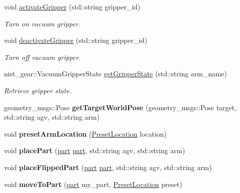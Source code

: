\begin{DoxyCompactItemize}
void \hyperlink{classGantryControl_aaccd9c43b5564c198288ba51cbcecabe}{activate\+Gripper} (std\+::string gripper\+\_\+id)
\begin{DoxyCompactList}\small\item\em Turn on vacuum gripper. \end{DoxyCompactList}\item 
\mbox{\label{classGantryControl_a1485577d4e29baf708a4c5c028a47798}} 
void \hyperlink{classGantryControl_a1485577d4e29baf708a4c5c028a47798}{deactivate\+Gripper} (std\+::string gripper\+\_\+id)
\begin{DoxyCompactList}\small\item\em Turn off vacuum gripper. \end{DoxyCompactList}\item 
\mbox{\label{classGantryControl_a986691834604135cf47b1c070f8d915e}} 
nist\+\_\+gear\+::\+Vacuum\+Gripper\+State \hyperlink{classGantryControl_a986691834604135cf47b1c070f8d915e}{get\+Gripper\+State} (std\+::string arm\+\_\+name)
\begin{DoxyCompactList}\small\item\em Retrieve gripper state. \end{DoxyCompactList}\item 
\mbox{\label{classGantryControl_ae92c2fdeba302399425c1abafc76f973}} 
geometry\+\_\+msgs\+::\+Pose {\bfseries get\+Target\+World\+Pose} (geometry\+\_\+msgs\+::\+Pose target, std\+::string agv, std\+::string arm)
\item 
\mbox{\label{classGantryControl_ab778742e4def5cfd5457b7d449daff28}} 
void {\bfseries preset\+Arm\+Location} (\hyperlink{structPresetLocation}{Preset\+Location} location)
\item 
\mbox{\label{classGantryControl_aea0cbcb3ded386ec8f25a3ac02c6e3ed}} 
void {\bfseries place\+Part} (\hyperlink{structPart}{part} \hyperlink{structPart}{part}, std\+::string agv, std\+::string arm)
\item 
\mbox{\label{classGantryControl_a39b1bb632160841716501dbfde828c8b}} 
void {\bfseries place\+Flipped\+Part} (\hyperlink{structPart}{part} \hyperlink{structPart}{part}, std\+::string agv, std\+::string arm)
\item 
\mbox{\label{classGantryControl_a1a285e0cf34fcad5e9661656d8c91ab9}} 
void {\bfseries move\+To\+Part} (\hyperlink{structPart}{part} my\+\_\+part, \hyperlink{structPresetLocation}{Preset\+Location} preset)
\end{DoxyCompactItemize}
